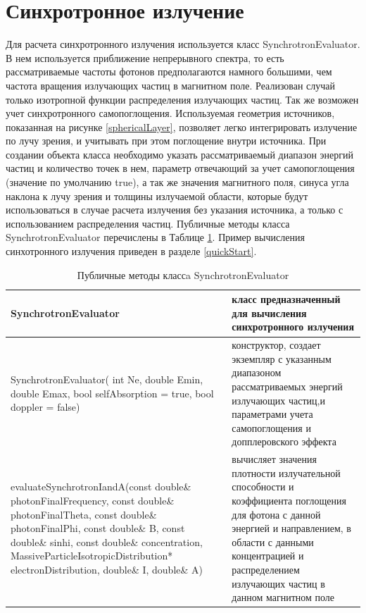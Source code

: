 \section{Синхротронное излучение}
Для расчета синхротронного излучения используется класс SynchrotronEvaluator. В нем используется приближение непрерывного спектра, то есть рассматриваемые частоты фотонов предполагаются намного большими, чем частота вращения излучающих частиц в магнитном поле. Реализован случай только изотропной функции распределения излучающих частиц. Так же возможен учет синхротронного самопоглощения. Используемая геометрия источников, показанная на рисунке \ref{sphericalLayer}, позволяет легко интегрировать излучение по лучу зрения, и учитывать при этом поглощение внутри источника. При создании объекта класса необходимо указать рассматриваемый диапазон энергий частиц и количество точек в нем, параметр отвечающий за учет самопоглощения (значение по умолчанию true), а так же значения магнитного поля, синуса угла наклона к лучу зрения и толщины излучаемой области, которые будут использоваться в случае расчета излучения без указания источника, а только с использованием распределения частиц. Публичные методы класса SynchrotronEvaluator перечислены в Таблице \ref{SynchrotronEvaluator}. Пример вычисления синхотронного излучения приведен в разделе \ref{quickStart}.
\begin{table}
	\begin{center}
	\begin{small}
	\caption{Публичные методы классa SynchrotronEvaluator }
	\label{SynchrotronEvaluator}
	\begin{tabularx}{\textwidth}{|X|X|} 
		\hline
		\textbf{SynchrotronEvaluator} & класс предназначенный для вычисления синхротронного излучения\\
		\hline
		SynchrotronEvaluator( int Ne, double Emin, double Emax, bool selfAbsorption = true, bool doppler = false) & конструктор, создает экземпляр с указанным диапазоном рассматриваемых энергий излучающих частиц,и параметрами учета самопоглощения и допплеровского эффекта\\
		\hline
		evaluateSynchrotronIandA(const double\& photonFinalFrequency, const double\& photonFinalTheta, const double\& photonFinalPhi, const double\& B, const double\& sinhi, const double\& concentration, MassiveParticleIsotropicDistribution* electronDistribution, double\& I, double\& A) & вычисляет значения плотности излучательной способности и коэффициента поглощения для фотона с данной энергией и направлением, в области с данными концентрацией и распределением излучающих частиц в данном магнитном поле\\
		\hline
	\end{tabularx}
\end{small}
\end{center}
\end{table}
